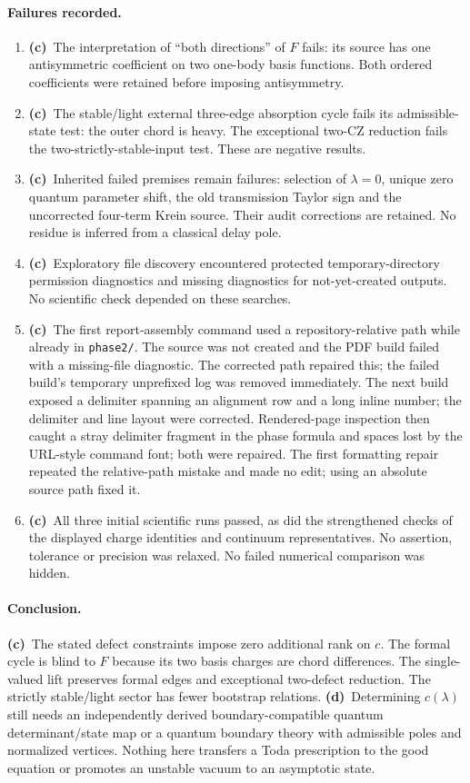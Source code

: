 \documentclass[11pt,a4paper]{article}
\newcommand{\C}{\textbf{(c)}\ }
\newcommand{\D}{\textbf{(d)}\ }
\newcommand{\file}[1]{\nolinkurl{#1}}
\begin{document}
\paragraph{Failures recorded.}
\begin{enumerate}
\item \C The interpretation of ``both directions'' of $F$ fails: its source
has one antisymmetric coefficient on two one-body basis functions. Both
ordered coefficients were retained before imposing antisymmetry.
\item \C The stable/light external three-edge absorption cycle fails its
admissible-state test: the outer chord is heavy. The exceptional two-CZ
reduction fails the two-strictly-stable-input test. These are negative results.
\item \C Inherited failed premises remain failures: selection of $\lambda=0$,
unique zero quantum parameter shift, the old transmission Taylor sign and
the uncorrected four-term Krein source. Their audit corrections are retained.
No residue is inferred from a classical delay pole.
\item \C Exploratory file discovery encountered protected temporary-directory
permission diagnostics and missing diagnostics for not-yet-created outputs.
No scientific check depended on these searches.
\item \C The first report-assembly command used a repository-relative path
while already in \file{phase2/}. The source was not created and the PDF build
failed with a missing-file diagnostic. The corrected path repaired this;
the failed build's temporary unprefixed log was removed immediately.
The next build exposed a delimiter spanning an alignment row and a long
inline number; the delimiter and line layout were corrected. Rendered-page
inspection then caught a stray delimiter fragment in the phase formula and
spaces lost by the URL-style command font; both were repaired. The first
formatting repair repeated the relative-path mistake and made no edit;
using an absolute source path fixed it.
\item \C All three initial scientific runs passed, as did the strengthened checks
of the displayed charge identities and continuum representatives. No assertion, tolerance
or precision was relaxed. No failed numerical comparison was hidden.
\end{enumerate}

\paragraph{Conclusion.}
\C The stated defect constraints impose zero additional rank on $c$.
The formal cycle is blind to $F$ because its two basis charges are chord
differences. The single-valued lift preserves formal edges and exceptional
two-defect reduction. The strictly stable/light sector has fewer bootstrap
relations. \D Determining $c(\lambda)$ still needs an independently derived
boundary-compatible quantum determinant/state map or a quantum boundary
theory with admissible poles and normalized vertices. Nothing here transfers
a Toda prescription to the good equation or promotes an unstable vacuum
to an asymptotic state.
\end{document}
